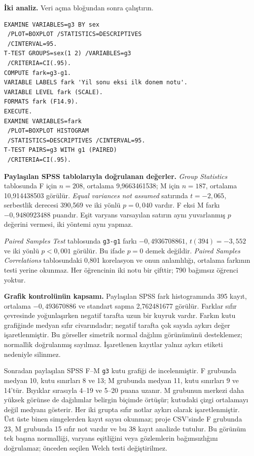 \par\noindent\begin{minipage}{\linewidth}
\textbf{İki analiz.} Veri açma bloğundan sonra çalıştırın.

\begin{lstlisting}[style=prismSPSS]
EXAMINE VARIABLES=g3 BY sex
 /PLOT=BOXPLOT /STATISTICS=DESCRIPTIVES
 /CINTERVAL=95.
T-TEST GROUPS=sex(1 2) /VARIABLES=g3
 /CRITERIA=CI(.95).
COMPUTE fark=g3-g1.
VARIABLE LABELS fark 'Yil sonu eksi ilk donem notu'.
VARIABLE LEVEL fark (SCALE).
FORMATS fark (F14.9).
EXECUTE.
EXAMINE VARIABLES=fark
 /PLOT=BOXPLOT HISTOGRAM
 /STATISTICS=DESCRIPTIVES /CINTERVAL=95.
T-TEST PAIRS=g3 WITH g1 (PAIRED)
 /CRITERIA=CI(.95).
\end{lstlisting}

\end{minipage}\par

\begin{outputguidebox}
\textbf{Paylaşılan SPSS tablolarıyla doğrulanan değerler.}
\emph{Group Statistics} tablosunda F için $n=208$, ortalama
9,9663461538; M için $n=187$, ortalama 10,914438503 görülür.
\emph{Equal variances not assumed} satırında $t=-2{,}065$,
serbestlik derecesi 390,569 ve iki yönlü $p=0{,}040$ vardır.
F eksi M farkı $-0{,}9480923488$ puandır. Eşit varyans varsayılan
satırın aynı yuvarlanmış $p$ değerini vermesi, iki yöntemi aynı yapmaz.

\emph{Paired Samples Test} tablosunda \texttt{g3-g1} farkı
$-0{,}4936708861$, $t(394)=-3{,}552$ ve iki yönlü $p<0{,}001$
görülür. Bu ifade $p=0$ demek değildir. \emph{Paired Samples
Correlations} tablosundaki 0,801 korelasyon ve onun anlamlılığı,
ortalama farkının testi yerine okunmaz. Her öğrencinin iki notu
bir çifttir; 790 bağımsız öğrenci yoktur.
\end{outputguidebox}

\textbf{Grafik kontrolünün kapsamı.} Paylaşılan SPSS fark histogramında
395 kayıt, ortalama $-0{,}493670886$ ve standart sapma 2,762481677
görülür. Farklar sıfır çevresinde yoğunlaşırken negatif tarafta uzun
bir kuyruk vardır. Farkın kutu grafiğinde medyan sıfır civarındadır;
negatif tarafta çok sayıda aykırı değer işaretlenmiştir. Bu görseller
simetrik normal dağılım görünümünü desteklemez; normallik doğrulanmış
sayılmaz. İşaretlenen kayıtlar yalnız aykırı etiketi nedeniyle silinmez.

Sonradan paylaşılan SPSS F--M \texttt{g3} kutu grafiği de incelenmiştir.
F grubunda medyan 10, kutu sınırları 8 ve 13; M grubunda medyan 11,
kutu sınırları 9 ve 14'tür. Bıyıklar sırasıyla 4--19 ve 5--20 puana
uzanır. M grubunun merkezi daha yüksek görünse de dağılımlar belirgin
biçimde örtüşür; kutudaki çizgi ortalamayı değil medyanı gösterir.
Her iki grupta sıfır notlar aykırı olarak işaretlenmiştir. Üst üste
binen simgelerden kayıt sayısı okunmaz; proje CSV'sinde F grubunda
23, M grubunda 15 sıfır not vardır ve bu 38 kayıt analizde tutulur.
Bu görünüm tek başına normalliği, varyans eşitliğini veya gözlemlerin
bağımsızlığını doğrulamaz; önceden seçilen Welch testi değiştirilmez.


